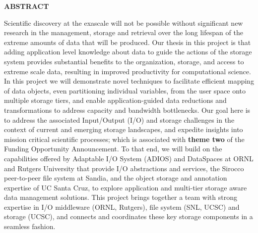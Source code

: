 \vspace{-\belowdisplayskip}
\vspace{-\abovedisplayskip}
\medskip

\begin{center}
\textbf{ABSTRACT}
\end{center}

\vspace{-\belowdisplayskip}

\enlargethispage{2\baselineskip}
Scientific discovery at the exascale will not be possible without significant
new research in the management, storage and retrieval over the long lifespan
of the extreme amounts of data that will be produced. Our thesis in this
project is that adding application level knowledge
about data to guide the actions of the storage system provides substantial
benefits to the organization, storage, and access to extreme scale data,
resulting in improved productivity for computational science. 
In this project we will
demonstrate novel techniques to  facilitate efficient mapping of data
objects, even partitioning individual variables, from
the user space onto multiple storage tiers, and enable application-guided
data reductions and transformations to address capacity and bandwidth
bottlenecks. 
Our goal here is
to address the associated Input/Output (I/O) and storage challenges in the context of
current and emerging storage landscapes, and expedite insights into mission
critical scientific processes; which is associated with {\bf theme two} of the Funding Opportunity Announcement. To that end, we will build on the
capabilities offered by Adaptable I/O System (ADIOS) and DataSpaces at ORNL
and Rutgers University that provide I/O abstractions
and services, the Sirocco peer-to-peer file system at
Sandia, and the object storage and annotation expertise of UC Santa Cruz, to
explore application and multi-tier storage aware data management
solutions.    This project
brings together a  team with strong expertise in I/O middleware (ORNL, Rutgers), file system (SNL, UCSC) and storage (UCSC), and connects and
coordinates these key storage components in a seamless fashion.

